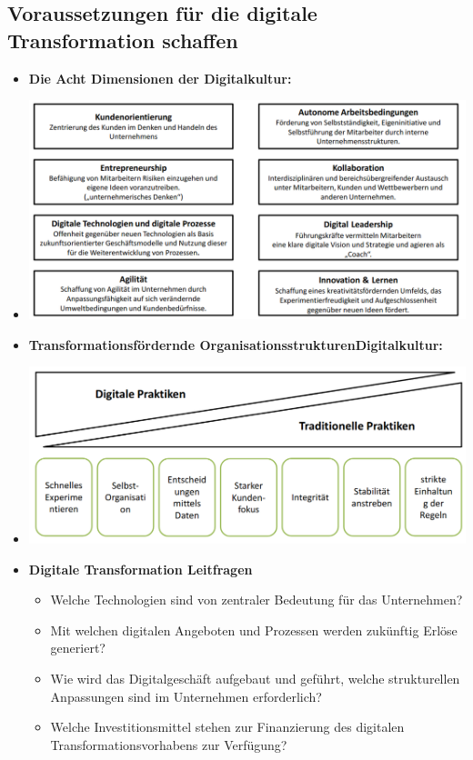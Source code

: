 \documentclass[12pt,a4paper]{article}
\begin{document}
\subsection{Voraussetzungen für die digitale Transformation schaffen} %
\begin{itemize}
   \item \textbf{Die Acht Dimensionen der Digitalkultur:}
   \item[] \includegraphics[scale=0.45]{8.png}
   
   \item \textbf{Transformationsfördernde OrganisationsstrukturenDigitalkultur:}
   \item[] \includegraphics[scale=0.3]{altneu.png}
   
   \item \textbf{Digitale Transformation Leitfragen}
         \begin{itemize}
            \item Welche Technologien sind von zentraler Bedeutung für das Unternehmen?
            \item Mit welchen digitalen Angeboten und Prozessen werden zukünftig Erlöse generiert?
            \item Wie wird das Digitalgeschäft aufgebaut und geführt, welche strukturellen Anpassungen sind im Unternehmen erforderlich?
            \item Welche Investitionsmittel stehen zur Finanzierung des digitalen Transformationsvorhabens zur Verfügung?
         \end{itemize}


\end{itemize}
\end{document}
